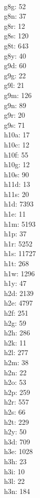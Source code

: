 \begin{multicols}{8}
  \\g8g: 52
  \\g8n: 37
  \\g8r: 12
  \\g8s: 120
  \\g8t: 643
  \\g8y: 40
  \\g9d: 60
  \\g9g: 22
  \\g9l: 21
  \\g9m: 126
  \\g9n: 89
  \\g9r: 20
  \\g9s: 71
  \\h10a: 17
  \\h10c: 12
  \\h10f: 55
  \\h10g: 12
  \\h10s: 90
  \\h11d: 13
  \\h11s: 20
  \\h1d: 7393
  \\h1e: 11
  \\h1m: 5193
  \\h1p: 37
  \\h1r: 5252
  \\h1s: 11727
  \\h1t: 268
  \\h1w: 1296
  \\h1y: 47
  \\h2d: 2139
  \\h2e: 4797
  \\h2f: 251
  \\h2g: 59
  \\h2h: 286
  \\h2k: 11
  \\h2l: 277
  \\h2m: 38
  \\h2n: 22
  \\h2o: 53
  \\h2p: 259
  \\h2r: 557
  \\h2s: 66
  \\h2t: 229
  \\h2y: 50
  \\h3d: 709
  \\h3e: 1028
  \\h3h: 23
  \\h3i: 10
  \\h3l: 22
  \\h3n: 184

\end{multicols}
